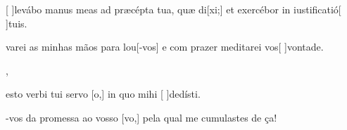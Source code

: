 {  {\item {}[ ]{le}vábo manus meas ad præcépta tua, quæ di[\-xi;] et exercébor in iustificatió[ ]{tu}is.~\Antiphona}%
    {\item {}varei as minhas mãos para lou[-vos] e com prazer meditarei vos[ ]{von}{ta}de.~\Antiphona},
  {\item {} esto verbi tui servo [o,] in quo mihi \allowbreak{}[ ]{de}{dí}sti.~\Antiphona}%
    {\item {}-vos da promessa ao vosso [vo,] pela qual me cumulastes de ça!~\Antiphona}
}